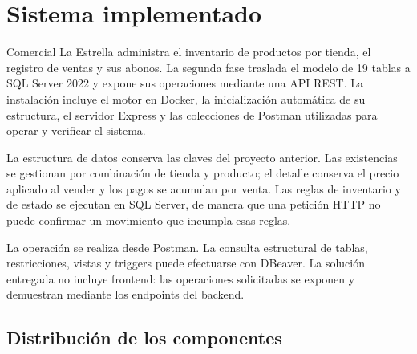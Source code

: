 \documentclass[10pt,letterpaper]{article}
\begin{document}
\section{Sistema implementado}
Comercial La Estrella administra el inventario de productos por tienda, el registro de ventas y sus abonos. La segunda fase traslada el modelo de 19 tablas a SQL Server 2022 y expone sus operaciones mediante una API REST. La instalación incluye el motor en Docker, la inicialización automática de su estructura, el servidor Express y las colecciones de Postman utilizadas para operar y verificar el sistema.

La estructura de datos conserva las claves del proyecto anterior. Las existencias se gestionan por combinación de tienda y producto; el detalle conserva el precio aplicado al vender y los pagos se acumulan por venta. Las reglas de inventario y de estado se ejecutan en SQL Server, de manera que una petición HTTP no puede confirmar un movimiento que incumpla esas reglas.

La operación se realiza desde Postman. La consulta estructural de tablas, restricciones, vistas y triggers puede efectuarse con DBeaver. La solución entregada no incluye frontend: las operaciones solicitadas se exponen y demuestran mediante los endpoints del backend.

\subsection{Distribución de los componentes}
\begin{center}
\end{center}
\end{document}
